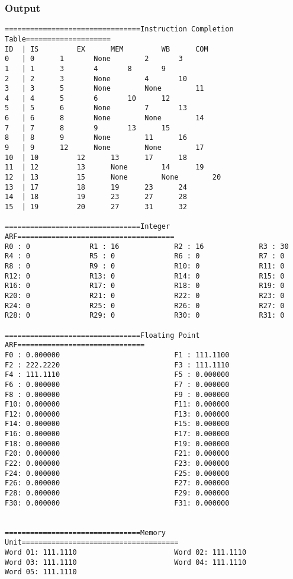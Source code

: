 \documentclass[12pt]{article}
\begin{document}
\subsubsection*{Output}
\begin{verbatim}
================================Instruction Completion Table====================
ID	| IS		 EX		 MEM		 WB		 COM
0	| 0		 1		 None		 2		 3
1	| 1		 3		 4		 8		 9
2	| 2		 3		 None		 4		 10
3	| 3		 5		 None		 None		 11
4	| 4		 5		 6		 10		 12
5	| 5		 6		 None		 7		 13
6	| 6		 8		 None		 None		 14
7	| 7		 8		 9		 13		 15
8	| 8		 9		 None		 11		 16
9	| 9		 12		 None		 None		 17
10	| 10		 12		 13		 17		 18
11	| 12		 13		 None		 14		 19
12	| 13		 15		 None		 None		 20
13	| 17		 18		 19		 23		 24
14	| 18		 19		 23		 27		 28
15	| 19		 20		 27		 31		 32

================================Integer ARF=====================================
R0 : 0              R1 : 16             R2 : 16             R3 : 30             
R4 : 0              R5 : 0              R6 : 0              R7 : 0              
R8 : 0              R9 : 0              R10: 0              R11: 0              
R12: 0              R13: 0              R14: 0              R15: 0              
R16: 0              R17: 0              R18: 0              R19: 0              
R20: 0              R21: 0              R22: 0              R23: 0              
R24: 0              R25: 0              R26: 0              R27: 0              
R28: 0              R29: 0              R30: 0              R31: 0              

================================Floating Point ARF==============================
F0 : 0.000000                           F1 : 111.1100                           
F2 : 222.2220                           F3 : 111.1110                           
F4 : 111.1110                           F5 : 0.000000                           
F6 : 0.000000                           F7 : 0.000000                           
F8 : 0.000000                           F9 : 0.000000                           
F10: 0.000000                           F11: 0.000000                           
F12: 0.000000                           F13: 0.000000                           
F14: 0.000000                           F15: 0.000000                           
F16: 0.000000                           F17: 0.000000                           
F18: 0.000000                           F19: 0.000000                           
F20: 0.000000                           F21: 0.000000                           
F22: 0.000000                           F23: 0.000000                           
F24: 0.000000                           F25: 0.000000                           
F26: 0.000000                           F27: 0.000000                           
F28: 0.000000                           F29: 0.000000                           
F30: 0.000000                           F31: 0.000000                           


================================Memory Unit=====================================
Word 01: 111.1110                       Word 02: 111.1110                       
Word 03: 111.1110                       Word 04: 111.1110                       
Word 05: 111.1110
\end{verbatim}
\end{document}
